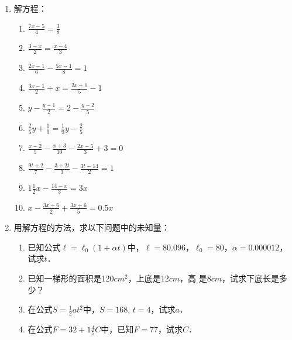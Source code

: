 \begin{enumerate}
\item 解方程：
\begin{multicols}{2}
\begin{enumerate}
\item $\frac{7x-5}{4}=\frac{3}{8}$
\item $\frac{3-x}{2}=\frac{x-4}{3}$
\item $\frac{2x-1}{6}-\frac{5x-1}{8}=1$
\item $\frac{3x-1}{2}+x=\frac{2x+1}{5}-1$
\item $y-\frac{y-1}{2}=2-\frac{y-2}{5}$
\item $\frac{2}{5}y+\frac{1}{9}=\frac{1}{9}y-\frac{2}{5}$
\item $\frac{x-2}{5}-\frac{x+3}{10}-\frac{2x-5}{3}+3=0$
\item $\frac{9t+2}{7}-\frac{3+2t}{3}-\frac{3t-14}{2}=1$
\item $1\frac{1}{2}x-\frac{14-x}{3}=3x$
\item $x-\frac{3x+6}{2}+\frac{3x+6}{5}=0.5x$    
\end{enumerate}
\end{multicols}
\item 用解方程的方法，求以下问题中的未知量：
\begin{enumerate}
    \item 已知公式$\ell=\ell_0(1+\alpha t)$中，$\ell= 80.096$，$\ell_0 = 80$，$\alpha=0.000012$，试求$t$．
\item 已知一梯形的面积是120$cm^2$，上底是12$cm$，高
是8$cm$，试求下底长是多少？
\item 在公式$S=\frac{1}{2}at^2$中，$S=168$, $t=4$，试求$a$．
\item 在公式$F=32+1\frac{4}{5}C$中，已知$F=77$，试求$C$．
\end{enumerate}


\end{enumerate}
